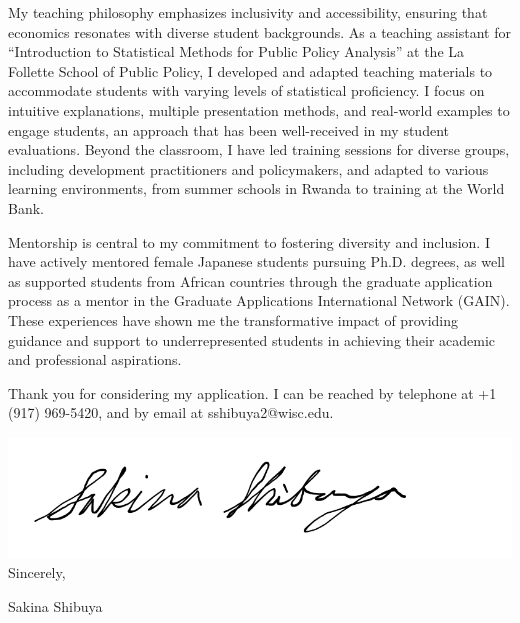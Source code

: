 \documentclass[12pt]{letter}
\begin{document}
My teaching philosophy emphasizes inclusivity and accessibility, ensuring that economics resonates with diverse student backgrounds. 
As a teaching assistant for “Introduction to Statistical Methods for Public Policy Analysis” at the La Follette School of Public Policy, 
I developed and adapted teaching materials to accommodate students with varying levels of statistical proficiency. 
I focus on intuitive explanations, multiple presentation methods, and real-world examples to engage students, an approach that has been well-received 
in my student evaluations. Beyond the classroom, I have led training sessions for diverse groups, including development practitioners and policymakers, 
and adapted to various learning environments, from summer schools in Rwanda to training at the World Bank.

Mentorship is central to my commitment to fostering diversity and inclusion. I have actively mentored female Japanese students pursuing Ph.D. degrees, 
as well as supported students from African countries through the graduate application process as a mentor in the Graduate Applications International Network (GAIN). 
These experiences have shown me the transformative impact of providing guidance and support to underrepresented students in achieving their academic and 
professional aspirations.

Thank you for considering my application. 
I can be reached by telephone at +1 (917) 969-5420, and by email at sshibuya2@wisc.edu.

\bigskip

\includegraphics[height=4\baselineskip]{signature.png}  \\

\vspace*{-6.5\baselineskip}Sincerely, 

\vspace{2.5\baselineskip}Sakina Shibuya
\end{document}
